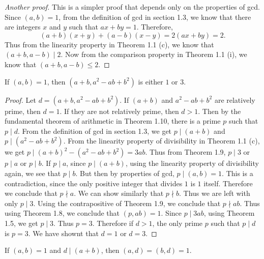 \begin{proof}[Another proof]
  This is a simpler proof that depends only on the properties of gcd.
  Since \( (a, b) = 1 \), from the definition of gcd in section 1.3,
  we know that there are integers \( x \) and \( y \) such that \( ax
  + by = 1 \). Therefore,
  \[ (a + b)(x + y) + (a - b)(x - y) = 2(ax + by) = 2. \]
  Thus from the linearity property in Theorem 1.1 (c), we know that \(
  (a + b, a - b) \mid 2 \). Now from the comparison property in
  Theorem 1.1 (i), we know that \( (a + b, a - b) \le 2 \).
\end{proof}


\begin{exercise}{1.5}
  If \( (a, b) = 1 \), then \( (a + b, a^2 - ab + b^2) \) is either \(
  1 \) or \( 3 \).
\end{exercise}

\begin{proof}
  Let \( d = (a + b, a^2 - ab + b^2) \). If \( (a + b) \) and \( a^2 -
  ab + b^2 \) are relatively prime, then \( d = 1 \). If they are not
  relatively prime, then \( d > 1 \). Then by the fundamental theorem
  of arithmetic in Theorem 1.10, there is a prime \( p \) such that \(
  p \mid d \). From the definition of gcd in section 1.3, we get \( p
  \mid (a + b) \) and \( p \mid (a^2 - ab + b^2) \). From the
  linearity property of divisibility in Theorem 1.1 (c), we get \( p
  \mid (a + b)^2 - (a^2 - ab + b^2) = 3ab \). Thus from Theorem 1.9,
  \( p \mid 3 \) or \( p \mid a \) or \( p \mid b \). If \( p \mid a
  \), since \( p \mid (a + b) \), using the linearity property of
  divisibility again, we see that \( p \mid b \). But then by
  properties of gcd, \( p \mid (a, b) = 1 \). This is a contradiction,
  since the only positive integer that divides \( 1 \) is \( 1 \)
  itself. Therefore we conclude that \( p \nmid a \). We can show
  similarly that \( p \nmid b \). Thus we are left with only \( p \mid
  3 \). Using the contrapositive of Theorem 1.9, we conclude that \( p
  \nmid ab \). Thus using Theorem 1.8, we conclude that \( (p, ab) = 1
  \). Since \( p \mid 3ab \), using Theorem 1.5, we get \( p \mid 3
  \). Thus \( p = 3 \). Therefore if \( d > 1 \), the only prime \( p
  \) such that \( p \mid d \) is \( p = 3 \). We have shownt that \( d
  = 1 \) or \( d = 3 \).
\end{proof}


\begin{exercise}{1.6}
  If \( (a, b) = 1 \) and \( d \mid (a + b) \), then \( (a, d) = (b, d) = 1 \).
\end{exercise}

